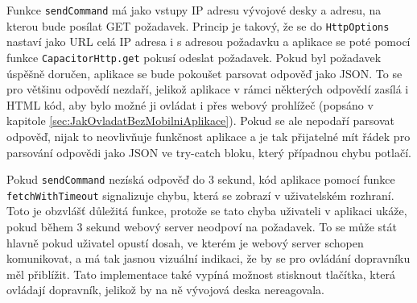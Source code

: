 Funkce \texttt{sendCommand} má jako vstupy IP adresu vývojové desky a adresu, na kterou bude posílat GET požadavek. Princip je takový, že se do \texttt{HttpOptions} nastaví jako URL celá IP adresa i s adresou požadavku a aplikace se poté pomocí funkce \texttt{CapacitorHttp.get} pokusí odeslat požadavek. Pokud byl požadavek úspěšně doručen, aplikace se bude pokoušet parsovat odpověď jako JSON. To se pro většinu odpovědí nezdaří, jelikož aplikace v rámci některých odpovědí zasílá i HTML kód, aby bylo možné ji ovládat i přes webový prohlížeč (popsáno v kapitole \ref{sec:JakOvladatBezMobilniAplikace}). Pokud se ale nepodaří parsovat odpověď, nijak to neovlivňuje funkčnost aplikace a je tak přijatelné mít řádek pro parsování odpovědi jako JSON ve try-catch bloku, který případnou chybu potlačí.

Pokud \texttt{sendCommand} nezíská odpověď do 3 sekund, kód aplikace pomocí funkce \texttt{fetchWithTimeout} signalizuje chybu, která se zobrazí v uživatelském rozhraní. Toto je obzvlášť důležitá funkce, protože se tato chyba uživateli v aplikaci ukáže, pokud během 3 sekund webový server neodpoví na požadavek. To se může stát hlavně pokud uživatel opustí dosah, ve kterém je webový server schopen komunikovat, a má tak jasnou vizuální indikaci, že by se pro ovládání dopravníku měl přiblížit. Tato implementace také vypíná možnost stisknout tlačítka, která ovládají dopravník, jelikož by na ně vývojová deska nereagovala.

